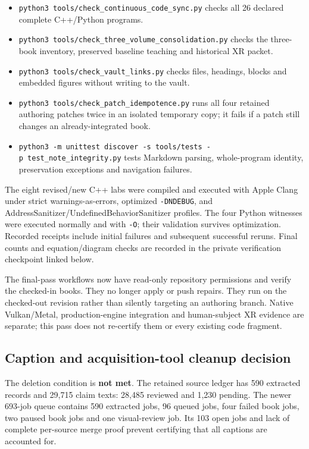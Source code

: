 \begin{itemize}
\tightlist
\item
  \texttt{python3\ tools/check\_continuous\_code\_sync.py} checks all 26 declared complete C++/Python programs.
\item
  \texttt{python3\ tools/check\_three\_volume\_consolidation.py} checks the three-book inventory, preserved baseline teaching and historical XR packet.
\item
  \texttt{python3\ tools/check\_vault\_links.py} checks files, headings, blocks and embedded figures without writing to the vault.
\item
  \texttt{python3\ tools/check\_patch\_idempotence.py} runs all four retained authoring patches twice in an isolated temporary copy; it fails if a patch still changes an already-integrated book.
\item
  \texttt{python3\ -m\ unittest\ discover\ -s\ tools/tests\ -p\ test\_note\_integrity.py} tests Markdown parsing, whole-program identity, preservation exceptions and navigation failures.
\end{itemize}

The eight revised/new C++ labs were compiled and executed with Apple Clang under strict warnings-as-errors, optimized \texttt{-DNDEBUG}, and AddressSanitizer/UndefinedBehaviorSanitizer profiles. The four Python witnesses were executed normally and with \texttt{-O}; their validation survives optimization. Recorded receipts include initial failures and subsequent successful reruns. Final counts and equation/diagram checks are recorded in the private verification checkpoint linked below.

The final-pass workflows now have read-only repository permissions and verify the checked-in books. They no longer apply or push repairs. They run on the checked-out revision rather than silently targeting an authoring branch. Native Vulkan/Metal, production-engine integration and human-subject XR evidence are separate; this pass does not re-certify them or every existing code fragment.

\subsection{Caption and acquisition-tool cleanup decision}\label{appendix-faa2b5a8e820-caption-and-acquisition-tool-cleanup-decision}

\hypertarget{appendix-faa2b5a8e820-caption-and-acquisition-tool-cleanup-decision}{}

The deletion condition is \textbf{not met}. The retained source ledger has 590 extracted records and 29,715 claim texts: 28,485 reviewed and 1,230 pending. The newer 693-job queue contains 590 extracted jobs, 96 queued jobs, four failed book jobs, two paused book jobs and one visual-review job. Its 103 open jobs and lack of complete per-source merge proof prevent certifying that all captions are accounted for.


